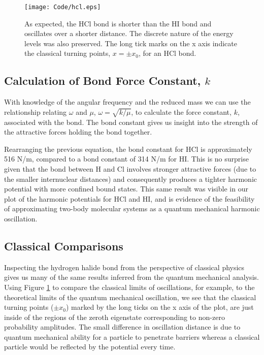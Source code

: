 \documentclass[11pt]{article}
\begin{document}
\begin{figure}[h]
\begin{center}
\texttt{[image: Code/hcl.eps]}
\caption[hcl plot]{As expected, the HCl bond is shorter than the HI bond and oscillates over a shorter distance. The discrete nature of the energy levels was also preserved. The long tick marks on the x axis indicate the classical turning points, $x = \pm x_{0}$, for an HCl bond.}
\label{fig:hcl}
\end{center}
\end{figure}

\subsection{Calculation of Bond Force Constant, $k$}
With knowledge of the angular frequency and the reduced mass we can use the relationship relating $\omega$ and $\mu$, $\omega = \sqrt{k/\mu}$, to calculate the force constant, $k$, associated with the bond. The bond constant gives us insight into the strength of the attractive forces holding the bond together. 

Rearranging the previous equation, the bond constant for HCl is approximately 516 N/m, compared to a bond constant of 314 N/m for HI. This is no surprise given that the bond between H and Cl involves stronger attractive forces (due to the smaller internuclear distances) and consequently produces a tighter harmonic potential with more confined bound states. This same result was visible in our plot of the harmonic potentials for HCl and HI, and is evidence of the feasibility of approximating two-body molecular systems as a quantum mechanical harmonic oscillation.

\subsection{Classical Comparisons}
Inspecting the hydrogen halide bond from the perspective of classical physics gives us many of the same results inferred from the quantum mechanical analysis. Using Figure \ref{fig:hcl} to compare the classical limits of oscillations, for example, to the theoretical limits of the quantum mechanical oscillation, we see that the classical turning points ($\pm x_{0}$) marked by the long ticks on the x axis of the plot, are just inside of the regions of the zeroth eigenstate corresponding to non-zero probability amplitudes. The small difference in oscillation distance is due to quantum mechanical ability for a particle to penetrate barriers whereas a classical particle would be reflected by the potential every time.
\end{document}
